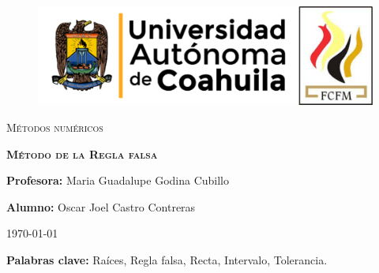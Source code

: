 \documentclass[12pt]{article}
\begin{document}
		
		\begin{titlepage}
		
			\centering
			{\bfseries
			\begin{figure}[h!]
				\centering
				\includegraphics[width=\linewidth]{Nom_UAdeC_FCFM.png} 				
			\end{figure}
			\par}
			\vspace{2cm}
			{\scshape\LARGE Métodos numéricos \par}
			\vspace{3cm}
			{\scshape\Huge \textbf{Método de la Regla falsa} \par}
			\vfill
			{\LARGE \textbf{Profesora:} Maria Guadalupe Godina Cubillo \par}
			\vspace{3cm}
			{\LARGE \textbf{Alumno:} Oscar Joel Castro Contreras \par}
			\vfill
			{\Large \today \par}
			\thispagestyle{empty}
			
		\end{titlepage}
	
		\newpage

		\begin{abstract}
			\noindent En este reporte explico un poco de los métodos que existen para encontrar las raíces de cualquier 
			polinomio o función que tenga raíces, y en específico explico, qué es, en que consiste y cuales son las 
			limitaciones del método de la Regla falsa para encontrar raíces.
		\end{abstract}

		\textbf{Palabras clave:} Raíces, Regla falsa, Recta, Intervalo, Tolerancia.
\end{document}
